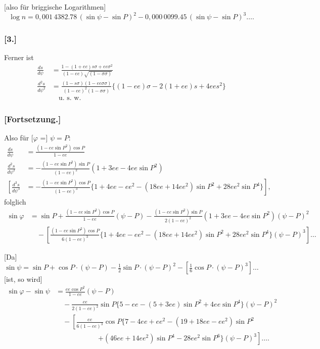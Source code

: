\documentclass[12pt,a4paper]{article}
\theoremstyle{plain}
\theoremstyle{definition}
\theoremstyle{remark}
\newcommand{\ee}{\mathit{ee}}
\begin{document}
[also für briggische Logarithmen]
\[
\log n = 0{,}001\,4382.78\,(\sin\psi - \sin P)^2 - 0{,}000\,0099.45\,(\sin\psi - \sin P)^3 \ldots.
\]

\subsubsection*{[3.]}
Ferner ist
\[
\begin{aligned}
\frac{ds}{d\psi} &= \frac{1 - (1 + \ee)s\sigma + \ee\sigma^2}{(1 - \ee)\sqrt{(1 - \sigma\sigma)}} \\
\frac{d^2s}{d\psi^2} &= \frac{(1 - s\sigma)(1 - \ee\sigma\sigma)}{(1 - \ee)^2(1 - \sigma\sigma)}\{(1 - \ee)\sigma - 2(1 + \ee)s + 4\ee s^2\} \\
&\quad\text{u.~s.~w.}
\end{aligned}
\]

\subsubsection*{[Fortsetzung.]}
Also für [$\varphi$ =] $\psi = P$:
\[
\begin{aligned}
\frac{ds}{d\psi} &= \frac{(1 - \ee\sin P^2)\cos P}{1 - \ee} \\
\frac{d^2s}{d\psi^2} &= -\frac{(1 - \ee\sin P^2)\sin P}{(1 - \ee)^2}(1 + 3\ee - 4\ee\sin P^2) \\
\left[\frac{d^3s}{d\psi^3}\right. &= \left. -\frac{(1 - \ee\sin P^2)\cos P}{(1 - \ee)^3}\{1 + 4\ee - \ee^2 - (18\ee + 14\ee^2)\sin P^2 + 28\ee^2\sin P^4\}\right],
\end{aligned}
\]
folglich
\[
\begin{aligned}
\sin\varphi &= \sin P + \frac{(1 - \ee\sin P^2)\cos P}{1 - \ee}(\psi - P) - \frac{(1 - \ee\sin P^2)\sin P}{2(1 - \ee)^2}(1 + 3\ee - 4\ee\sin P^2)(\psi - P)^2 \\
&\quad - \left[\frac{(1 - \ee\sin P^2)\cos P}{6(1 - \ee)^3}\{1 + 4\ee - \ee^2 - (18\ee + 14\ee^2)\sin P^2 + 28\ee^2\sin P^4\}(\psi - P)^3\right] \ldots
\end{aligned}
\]

[Da]
\[
\sin\psi = \sin P + \cos P\cdot(\psi - P) - \tfrac{1}{2}\sin P\cdot(\psi - P)^2 - [\tfrac{1}{6}\cos P\cdot(\psi - P)^3] \ldots
\]
[ist, so wird]
\[
\begin{aligned}
\sin\varphi - \sin\psi &= \frac{\ee\cos P^2}{1 - \ee}(\psi - P) \\
&\quad - \frac{\ee}{2(1 - \ee)^2}\sin P\{5 - \ee - (5 + 3\ee)\sin P^2 + 4\ee\sin P^4\}(\psi - P)^2 \\
&\quad - \left[\frac{\ee}{6(1 - \ee)^3}\cos P\{7 - 4\ee + \ee^2 - (19 + 18\ee - \ee^2)\sin P^2\right. \\
&\qquad\qquad\qquad\left. + (46\ee + 14\ee^2)\sin P^4 - 28\ee^2\sin P^6\}(\psi - P)^3\right] \ldots.
\end{aligned}
\]
\end{document}
